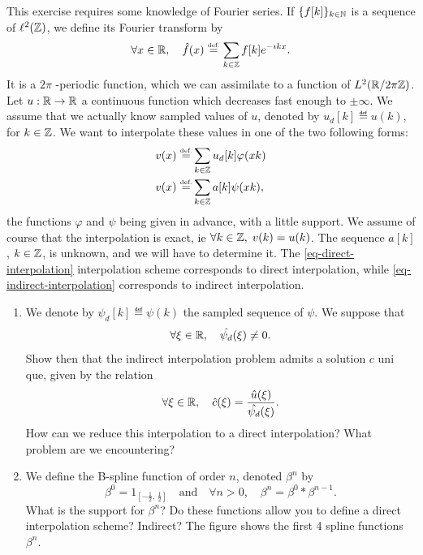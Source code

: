 
\begin{exo}
\label{exo-spline-filtering}
 
    This exercise requires some knowledge of Fourier series. If $ \{f [k] \}_{k \in \mathbb{N}} $ is a sequence of $ \ell^2 (\mathbb{Z}) $, we define its Fourier transform by
\begin{equation*}
\forall x \in \mathbb{R}, \quad \hat{f} (x) \stackrel{\mbox{\upshape\tiny def.}}{=} \sum_{k \in \mathbb{Z}}{f [k] e^{- \imath kx}}.
\end{equation*}
It is a $ 2 \pi $ -periodic function, which we can assimilate to a function of $ L^2 (\mathbb{R} / 2 \pi \mathbb{Z}) $. \\Let $ u: \mathbb{R} \rightarrow \mathbb{R} $ a continuous function which decreases fast enough to $ \pm \infty $. We assume that we actually know sampled values of $ u $, denoted by $ u_d [k] \eqdef u (k) $, for $ k \in \mathbb{Z} $. We want to interpolate these values in one of the two following forms:
\begin{align}
\label{eq-direct-interpolation}
v (x) \stackrel{\mbox{\upshape\tiny def.}}{=} & \sum_{k \in \mathbb{Z}}{u_d [k] \varphi (xk)} \\
\label{eq-indirect-interpolation}
v (x) \stackrel{\mbox{\upshape\tiny def.}}{=} & \sum_{k \in \mathbb{Z}}{a [k] \psi (xk)},
\end{align}
 the functions $ \varphi $ and $ \psi $ being given in advance, with a little support. We assume of course that the interpolation is exact, ie $ \forall k \in \mathbb{Z}, \; v (k) = u (k) $. The sequence $ a [k] $, $ k \in \mathbb{Z} $, is unknown, and we will have to determine it. The \eqref{eq-direct-interpolation} interpolation scheme corresponds to direct interpolation, while \eqref{eq-indirect-interpolation} corresponds to indirect interpolation. \begin{enumerate}
\item We denote by $ \psi_d [k] \eqdef \psi (k) $ the sampled sequence of $ \psi $. We suppose that
\begin{equation*}
\forall \xi \in \mathbb{R}, \quad \hat{\psi_d} (\xi) \neq 0.
\end{equation*}
Show then that the indirect interpolation problem admits a solution $ c $ uni \-que, given by the relation
\begin{equation*}
\forall \xi \in \mathbb{R}, \quad \hat{c} (\xi) = \frac{\hat{u} (\xi)}{\hat{\psi_d} (\xi)}.
\end{equation*}
How can we reduce this interpolation to a direct interpolation? What problem are we encountering?
\item \label{notation-57} We define the B-spline function of order $ n $, denoted $ \beta^n $ by
\begin{equation*}
\beta^0 = 1_{[- \frac{1}{2}, \, \frac{1}{2}]} \quad \text{and} \quad \forall n> 0, \quad \beta^n = \beta^0 * \beta^{n-1}.
\end{equation*}
 What is the support for $ \beta^n $? Do these functions allow you to define a direct interpolation scheme? Indirect? The figure  shows the first 4 spline functions $ \beta^n $. 


\end{enumerate}
\end{exo}

